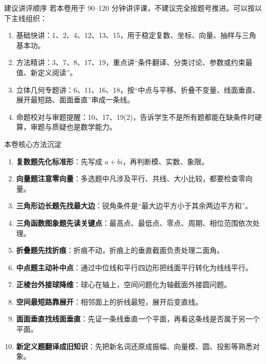 \documentclass[11pt,a4paper]{ctexart}
\begin{document}
\begin{teachbox}{建议讲评顺序}
若本卷用于 90--120 分钟讲评课，不建议完全按题号推进。可以按以下主线组织：
\begin{enumerate}[label=\arabic*. , leftmargin=2em, itemsep=0.25em]
  \item 基础快讲：1、2、4、12、13、15，用于稳定复数、坐标、向量、抽样与三角基本功。
  \item 方法精讲：3、7、8、17、19，重点讲“条件翻译、分类讨论、参数或约束最值、新定义阅读”。
  \item 立体几何专题讲：6、11、16、18，按“中点与平移、折叠不变量、线面垂直、展开最短路、面面垂直”串成一条线。
  \item 命题校对与审题提醒：10、17、19(2)，告诉学生不是所有题都能在缺条件时硬算，审题与质疑也是数学能力。
\end{enumerate}
\end{teachbox}

\begin{keybox}{本卷核心方法沉淀}
\begin{enumerate}[label=\arabic*. , leftmargin=2em, itemsep=0.25em]
  \item \textbf{复数题先化标准形}：先写成 \(a+bi\)，再判断模、实数、象限。
  \item \textbf{向量题注意零向量}：多选题中凡涉及平行、共线、大小比较，都要检查零向量。
  \item \textbf{三角形边长题先找最大边}：锐角条件是“最大边平方小于其余两边平方和”。
  \item \textbf{三角函数图象题先读关键点}：最高点、最低点、零点、周期、相位范围依次处理。
  \item \textbf{折叠题先找折痕}：折痕不动，折痕上的垂直截面负责处理二面角。
  \item \textbf{中点题主动补中点}：通过中位线和平行四边形把线面平行转化为线线平行。
  \item \textbf{正棱台外接球降维}：球心在轴上，空间问题化为轴截面外接圆问题。
  \item \textbf{空间最短路靠展开}：相邻面上的折线最短，展开后变直线。
  \item \textbf{面面垂直找线面垂直}：先证一条线垂直一个平面，再看这条线是否属于另一个平面。
  \item \textbf{新定义题翻译成旧知识}：先把新名词还原成振幅、向量模、圆、投影等熟悉对象。
\end{enumerate}
\end{keybox}
\end{document}
